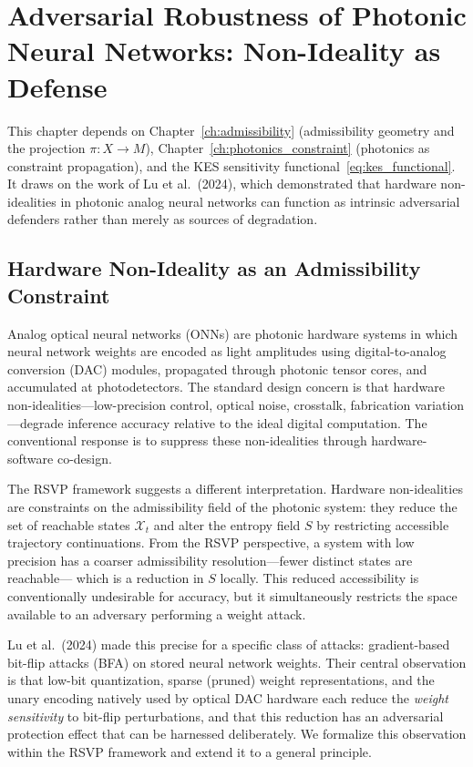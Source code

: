 \documentclass[11pt, openright, twoside]{book}
\theoremstyle{plain}
\theoremstyle{definition}
\theoremstyle{remark}
\newcommand{\Sfield}{S}
\newcommand{\Traj}{X}
\newcommand{\Rep}{M}
\newcommand{\proj}{\pi}
\begin{document}
\chapter{Adversarial Robustness of Photonic Neural Networks: Non-Ideality as Defense}
\label{ch:adversarial}

\begin{depbox}
This chapter depends on Chapter~\ref{ch:admissibility} (admissibility geometry and the
projection $\proj:\Traj\to\Rep$), Chapter~\ref{ch:photonics_constraint} (photonics as
constraint propagation), and the KES sensitivity functional~\eqref{eq:kes_functional}.
It draws on the work of Lu et al.\ (2024), which demonstrated that hardware
non-idealities in photonic analog neural networks can function as intrinsic adversarial
defenders rather than merely as sources of degradation.
\end{depbox}

\section{Hardware Non-Ideality as an Admissibility Constraint}

Analog optical neural networks (ONNs) are photonic hardware systems in which neural
network weights are encoded as light amplitudes using digital-to-analog conversion (DAC)
modules, propagated through photonic tensor cores, and accumulated at photodetectors. The
standard design concern is that hardware non-idealities---low-precision control, optical
noise, crosstalk, fabrication variation---degrade inference accuracy relative to the
ideal digital computation. The conventional response is to suppress these non-idealities
through hardware-software co-design.

The RSVP framework suggests a different interpretation. Hardware non-idealities are
constraints on the admissibility field of the photonic system: they reduce the set of
reachable states $\mathcal{X}_t$ and alter the entropy field $\Sfield$ by restricting
accessible trajectory continuations. From the RSVP perspective, a system with low
precision has a coarser admissibility resolution---fewer distinct states are reachable---
which is a reduction in $\Sfield$ locally. This reduced accessibility is conventionally
undesirable for accuracy, but it simultaneously restricts the space available to an
adversary performing a weight attack.

Lu et al.\ (2024) made this precise for a specific class of attacks: gradient-based
bit-flip attacks (BFA) on stored neural network weights. Their central observation is
that low-bit quantization, sparse (pruned) weight representations, and the unary encoding
natively used by optical DAC hardware each reduce the \emph{weight sensitivity} to
bit-flip perturbations, and that this reduction has an adversarial protection effect that
can be harnessed deliberately. We formalize this observation within the RSVP framework
and extend it to a general principle.
\end{document}
